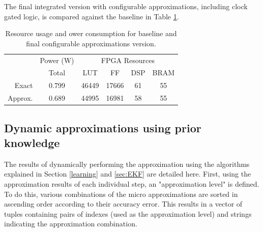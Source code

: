 \par The final integrated version with configurable approximations, including clock gated logic, is compared against the baseline in Table \ref{table:integrated}.


\begin{table}[h]
\begin{tabular}{r c c c c c}
\toprule
 & Power (W) & \multicolumn{4}{c}{FPGA Resources}\\
 & Total & LUT & FF & DSP & BRAM\\
\hline
Exact & 0.799 & 46449 & 17666 & 61 & 55\\
Approx. & 0.689 & 44995 & 16981 & 58 & 55\\
\hline
\end{tabular}
\caption{Resource usage and ower consumption for baseline and final configurable approximations version.}
\label{table:integrated}
\end{table}



\subsection{Dynamic approximations using prior knowledge}
The results of dynamically performing the approximation using the algorithms explained in Section \ref{learning} and \ref{sec:EKF} are detailed here. First, using the approximation results of each individual step, an "approximation level" is defined. To do this, various combinations of the micro approximations are sorted in ascending order according to their accuracy error. This results in a vector of tuples containing pairs of indexes (used as the approximation level) and strings indicating the approximation combination. 

